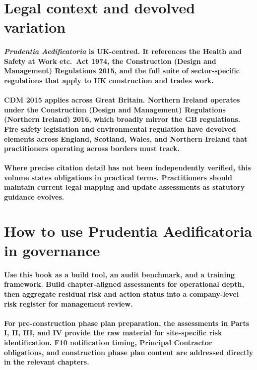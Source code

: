 \section{Legal context and devolved variation}

\paragraph{\textit{Prudentia Aedificatoria} is UK-centred. It references the Health and Safety at Work etc.\ Act 1974, the Construction (Design and Management) Regulations 2015, and the full suite of sector-specific regulations that apply to UK construction and trades work.}

\paragraph{CDM 2015 applies across Great Britain. Northern Ireland operates under the Construction (Design and Management) Regulations (Northern Ireland) 2016, which broadly mirror the GB regulations. Fire safety legislation and environmental regulation have devolved elements across England, Scotland, Wales, and Northern Ireland that practitioners operating across borders must track.}

\paragraph{Where precise citation detail has not been independently verified, this volume states obligations in practical terms. Practitioners should maintain current legal mapping and update assessments as statutory guidance evolves.}

\section{How to use Prudentia Aedificatoria in governance}

\paragraph{Use this book as a build tool, an audit benchmark, and a training framework. Build chapter-aligned assessments for operational depth, then aggregate residual risk and action status into a company-level risk register for management review.}

\paragraph{For pre-construction phase plan preparation, the assessments in Parts I, II, III, and IV provide the raw material for site-specific risk identification. F10 notification timing, Principal Contractor obligations, and construction phase plan content are addressed directly in the relevant chapters.}

